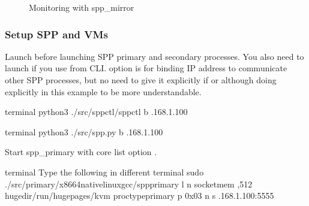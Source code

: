 \documentclass[a4paper,11pt,openany,oneside,english]{sphinxmanual}
\begin{document}
\begin{figure}[htbp]
\centering
\capstart

\noindent{}
\caption{Monitoring with spp\_mirror}\label{\detokenize{usecases/spp_mirror:id5}}\label{\detokenize{usecases/spp_mirror:figure-usecase-monitor-overview}}\end{figure}


\subsubsection{Setup SPP and VMs}
\label{\detokenize{usecases/spp_mirror:setup-spp-and-vms}}
Launch  before launching SPP primary and secondary processes.
You also need to launch   if you use  from CLI.
 option is for binding IP address to communicate other SPP processes,
but no need to give it explicitly if  or  although
doing explicitly in this example to be more understandable.

\begin{sphinxVerbatim}[commandchars=\\\{\},formatcom=\footnotesize]
 terminal 
 python3 ./src/spp\PYGZhy{}ctl/spp\PYGZhy{}ctl \PYGZhy{}b .168.1.100
\end{sphinxVerbatim}

\begin{sphinxVerbatim}[commandchars=\\\{\},formatcom=\footnotesize]
 terminal 
 python3 ./src/spp.py \PYGZhy{}b .168.1.100
\end{sphinxVerbatim}

Start spp\_primary with core list option .

\begin{sphinxVerbatim}[commandchars=\\\{\},formatcom=\footnotesize]
 terminal 
 Type the following in different terminal
 sudo ./src/primary/x86\PYGZus{}64\PYGZhy{}native\PYGZhy{}linux\PYGZhy{}gcc/spp\PYGZus{}primary 
    \PYGZhy{}l  \PYGZhy{}n  
    \PYGZhy{}\PYGZhy{}socket\PYGZhy{}mem ,512 
    \PYGZhy{}\PYGZhy{}huge\PYGZhy{}dir/run/hugepages/kvm 
    \PYGZhy{}\PYGZhy{}proc\PYGZhy{}typeprimary 
    \PYGZhy{}\PYGZhy{} 
    \PYGZhy{}p 0x03 
    \PYGZhy{}n  \PYGZhy{}s .168.1.100:5555
\end{sphinxVerbatim}
\end{document}
